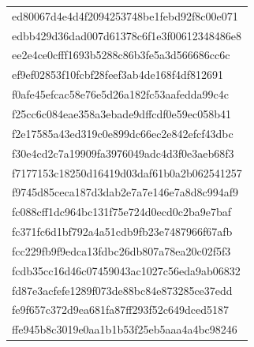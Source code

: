 \begin{tabular}{l}
ed80067d4e4d4f2094253748be1febd92f8c00e071 \\
edbb429d36dad007d61378c6f1e3f00612348486e8 \\
ee2e4ce0cfff1693b5288c86b3fe5a3d566686cc6c \\
ef9ef02853f10fcbf28feef3ab4de168f4df812691 \\
f0afe45efcac58e76e5d26a182fc53aafedda99c4c \\
f25cc6c084eae358a3ebade9dffcdf0e59ec058b41 \\
f2e17585a43ed319c0e899dc66ec2e842efcf43dbc \\
f30e4cd2c7a19909fa3976049adc4d3f0e3aeb68f3 \\
f7177153c18250d16419d03daf61b0a2b062541257 \\
f9745d85ceca187d3dab2e7a7e146e7a8d8c994af9 \\
fc088cff1dc964bc131f75e724d0ecd0c2ba9e7baf \\
fc371fc6d1bf792a4a51cdb9fb23e7487966f67afb \\
fcc229fb9f9edca13fdbc26db807a78ea20c02f5f3 \\
fcdb35cc16d46c07459043ac1027c56eda9ab06832 \\
fd87e3acfefe1289f073de88bc84e873285ce37edd \\
fe9f657c372d9ea681fa87ff293f52c649dced5187 \\
ffe945b8c3019e0aa1b1b53f25eb5aaa4a4bc98246 \\
\bottomrule
\end{tabular}
